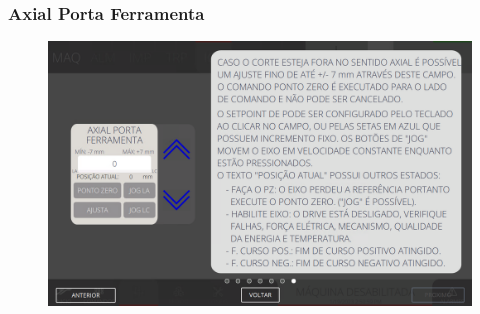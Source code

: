 \newpage
\thispagestyle{fancy}
\vspace*{40 pt}
\subsubsection{\small{Axial Porta Ferramenta}}  \label{sec:telaAjustesCorteEVincoAxialPortaFerramenta}
\vspace*{\fill}
\begin{figure}[h]
    \centering
    \includegraphics[width=576 px,height=360 px]{src/imagesICV/06-dryCutter/settings/e-7.png}
\end{figure}
\vspace*{\fill}
